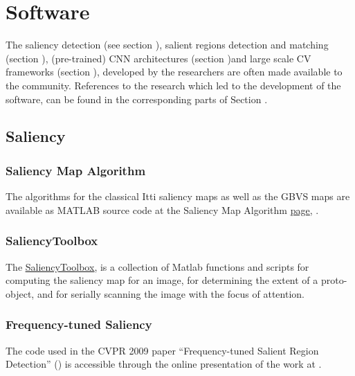 \section{Software}
\label{sec:soft}
 
The saliency detection (see section \underline{}), salient regions detection and matching  (section \underline{}), (pre-trained) CNN architectures  (section \underline{})and large scale CV frameworks (section \underline{}), developed by the researchers are often made available to the community. References to the research which led to the  development of the software, can be found in the corresponding parts of Section .

\subsection{Saliency}\label{subsec:salsoft}

\subsubsection{Saliency Map Algorithm} \label{subsec:salmap}
The algorithms for the classical Itti  \cite{Itti_Koch01nrn} saliency maps as well as the GBVS maps \cite{Harel07graph-basedvisual} are available as MATLAB source code at the Saliency Map Algorithm 
\href{http://www.vision.caltech.edu/~harel/share/gbvs.php}{\underline{page}}, \cite{salmap_soft}.

\subsubsection{SaliencyToolbox}\label{subsec:saltool}
The \href{http://saliencytoolbox.net/index.html}{\underline{SaliencyToolbox}}, \cite{saltool_soft} is a collection of Matlab functions and scripts for computing the saliency map for an image, for determining the extent of a proto-object, and for serially scanning the image with the focus of attention. 

\subsubsection{Frequency-tuned Saliency}\label{subsec:freqsal}
The code used in the CVPR 2009 paper ``Frequency-tuned Salient Region Detection'' (\cite{LCAV-CONF-2009-012}) is accessible through the online presentation of the work at \cite{achantaCVPR09}.

